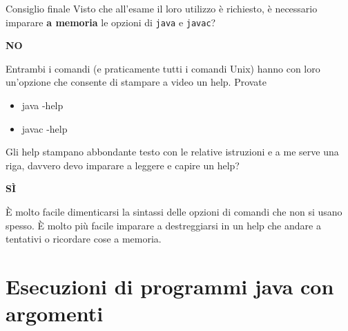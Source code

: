\documentclass[presentation]{beamer}
\begin{document}
\begin{frame}{Consiglio finale}
  Visto che all'esame il loro utilizzo è richiesto, è necessario imparare \textbf{a memoria} le opzioni di \texttt{java} e \texttt{javac}?
  \begin{center}
    \textbf{NO}
  \end{center}
  Entrambi i comandi (e praticamente tutti i comandi Unix) hanno con loro un'opzione che consente di stampare a video un help. Provate
  \begin{block}{}
    \begin{itemize}
      \item java -help
      \item javac -help
    \end{itemize}
  \end{block}
  \vspace{10pt}
  
  Gli help stampano abbondante testo con le relative istruzioni e a me serve una riga, davvero devo imparare a leggere e capire un help?
  \begin{center}
    \textbf{SÌ}
  \end{center}
  È molto facile dimenticarsi la sintassi delle opzioni di comandi che non si usano spesso. È molto più facile imparare a destreggiarsi in un help che andare a tentativi o ricordare cose a memoria.
\end{frame}

\section{Esecuzioni di programmi java con argomenti}
\end{document}
